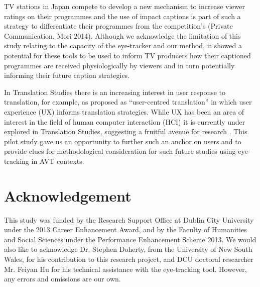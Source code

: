 \documentclass[output=paper]{langsci/langscibook}
\begin{document}
TV stations in Japan compete to develop a new mechanism to increase viewer ratings on their programmes and the use of impact captions is part of such a strategy to differentiate their programmes from the competition's (Private Communication, Mori 2014). Although we acknowledge the limitation of this study relating to the capacity of the eye-tracker and our method, it showed a potential for these tools to be used to inform TV producers how their captioned programmes are received physiologically by viewers and in turn potentially informing their future caption strategies.  



In Translation Studies there is an increasing interest in user response to translation, for example, as proposed as ``user-centred translation'' \citep{Suojanen2015} in which user experience (UX) informs translation strategies. While UX has been an area of interest in the field of human computer interaction (HCI) it is currently under explored in Translation Studies, suggesting a fruitful avenue for research \citep[312--318]{ohagan2013}. This pilot study gave us an opportunity to further such an anchor on users and to provide clues for methodological consideration for such future studies using eye-tracking in AVT contexts. 


\section*{Acknowledgement}

This study was funded by the Research Support Office at Dublin City University under the 2013 Career Enhancement Award, and by the Faculty of Humanities and Social Sciences under the Performance Enhancement Scheme 2013. We would also like to acknowledge Dr. Stephen Doherty, from the University of New South Wales, for his contribution to this research project, and DCU doctoral researcher Mr. Feiyan Hu for his technical assistance with the eye-tracking tool. However, any errors and omissions are our own. 
\end{document}
